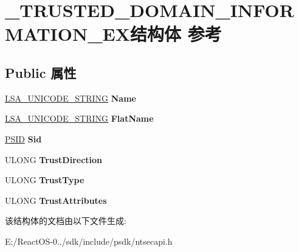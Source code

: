 \hypertarget{struct___t_r_u_s_t_e_d___d_o_m_a_i_n___i_n_f_o_r_m_a_t_i_o_n___e_x}{}\section{\+\_\+\+T\+R\+U\+S\+T\+E\+D\+\_\+\+D\+O\+M\+A\+I\+N\+\_\+\+I\+N\+F\+O\+R\+M\+A\+T\+I\+O\+N\+\_\+\+E\+X结构体 参考}
\label{struct___t_r_u_s_t_e_d___d_o_m_a_i_n___i_n_f_o_r_m_a_t_i_o_n___e_x}
\subsection*{Public 属性}
\begin{DoxyCompactItemize}
\item 
\mbox{\label{struct___t_r_u_s_t_e_d___d_o_m_a_i_n___i_n_f_o_r_m_a_t_i_o_n___e_x_ad4ffa69c5e59e1dd4f42cf0c406103fc}} 
\hyperlink{struct___l_s_a___u_n_i_c_o_d_e___s_t_r_i_n_g}{L\+S\+A\+\_\+\+U\+N\+I\+C\+O\+D\+E\+\_\+\+S\+T\+R\+I\+NG} {\bfseries Name}
\item 
\mbox{\label{struct___t_r_u_s_t_e_d___d_o_m_a_i_n___i_n_f_o_r_m_a_t_i_o_n___e_x_ab9d7c5e409cc0b0cb2aab54d38c1f0c4}} 
\hyperlink{struct___l_s_a___u_n_i_c_o_d_e___s_t_r_i_n_g}{L\+S\+A\+\_\+\+U\+N\+I\+C\+O\+D\+E\+\_\+\+S\+T\+R\+I\+NG} {\bfseries Flat\+Name}
\item 
\mbox{\label{struct___t_r_u_s_t_e_d___d_o_m_a_i_n___i_n_f_o_r_m_a_t_i_o_n___e_x_a636f71b9589a031bd0934d6d4f2951f0}} 
\hyperlink{struct___s_i_d}{P\+S\+ID} {\bfseries Sid}
\item 
\mbox{\label{struct___t_r_u_s_t_e_d___d_o_m_a_i_n___i_n_f_o_r_m_a_t_i_o_n___e_x_ae23f620fcb128dbe8f07010de4bea44a}} 
U\+L\+O\+NG {\bfseries Trust\+Direction}
\item 
\mbox{\label{struct___t_r_u_s_t_e_d___d_o_m_a_i_n___i_n_f_o_r_m_a_t_i_o_n___e_x_a9751e30aeeca2b68f31e6b4c3d4fa4f8}} 
U\+L\+O\+NG {\bfseries Trust\+Type}
\item 
\mbox{\label{struct___t_r_u_s_t_e_d___d_o_m_a_i_n___i_n_f_o_r_m_a_t_i_o_n___e_x_a20182eb98773aee7ef2379c0a4f4f410}} 
U\+L\+O\+NG {\bfseries Trust\+Attributes}
\end{DoxyCompactItemize}


该结构体的文档由以下文件生成\+:\begin{DoxyCompactItemize}
\item 
E\+:/\+React\+O\+S-\/0../sdk/include/psdk/ntsecapi.\+h\end{DoxyCompactItemize}
